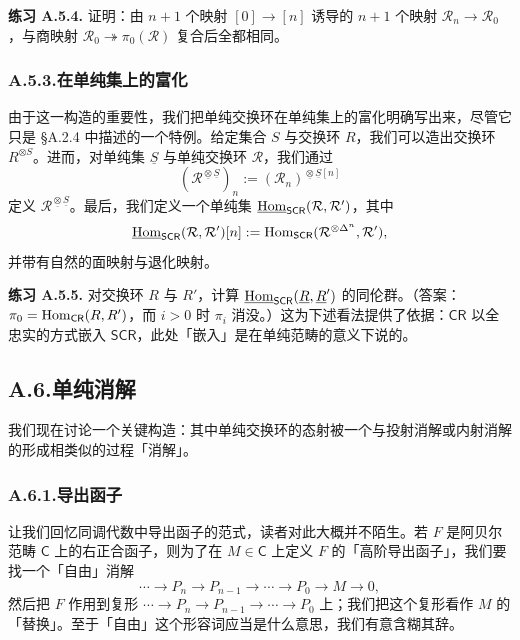 \medskip\noindent\textbf{练习 A.5.4.} 证明：由 $n+1$ 个映射 $[0]\to[n]$ 诱导的 $n+1$ 个映射 $\mathcal R_n\to\mathcal R_0$，与商映射 $\mathcal R_0\twoheadrightarrow\pi_0(\mathcal R)$ 复合后全都相同。

\subsubsection*{A.5.3.\quad 在单纯集上的富化}

由于这一构造的重要性，我们把单纯交换环在单纯集上的富化明确写出来，尽管它只是 §A.2.4 中描述的一个特例。给定集合 $S$ 与交换环 $R$，我们可以造出交换环 $R^{\otimes S}$。进而，对单纯集 $\underline S$ 与单纯交换环 $\mathcal R$，我们通过
\[
(\mathcal R^{\underline{\otimes}\underline S})_n:=(\mathcal R_n)^{\underline{\otimes}\underline S[n]}
\]
定义 $\mathcal R^{\underline{\otimes}\underline S}$。最后，我们定义一个单纯集 $\underline{\operatorname{Hom}}_{\mathsf{SCR}}(\mathcal R,\mathcal R')$，其中
\[
\underline{\operatorname{Hom}}_{\mathsf{SCR}}(\mathcal R,\mathcal R')[n]:=\operatorname{Hom}_{\mathsf{SCR}}(\mathcal R^{\otimes\Delta^n},\mathcal R'),
\]
并带有自然的面映射与退化映射。

\medskip\noindent\textbf{练习 A.5.5.} 对交换环 $R$ 与 $R'$，计算 $\underline{\operatorname{Hom}}_{\mathsf{SCR}}(\underline R,\underline R')$ 的同伦群。（答案：$\pi_0=\operatorname{Hom}_{\mathsf{CR}}(R,R')$，而 $i>0$ 时 $\pi_i$ 消没。）这为下述看法提供了依据：$\mathsf{CR}$ 以全忠实的方式嵌入 $\mathsf{SCR}$，此处「嵌入」是在单纯范畴的意义下说的。

\subsection*{A.6.\quad 单纯消解}

我们现在讨论一个关键构造：其中单纯交换环的态射被一个与投射消解或内射消解的形成相类似的过程「消解」。

\subsubsection*{A.6.1.\quad 导出函子}

让我们回忆同调代数中导出函子的范式，读者对此大概并不陌生。若 $F$ 是阿贝尔范畴 $\mathsf C$ 上的右正合函子，则为了在 $M\in\mathsf C$ 上定义 $F$ 的「高阶导出函子」，我们要找一个「自由」消解
\[
\cdots\to P_n\to P_{n-1}\to\cdots\to P_0\to M\to0,
\]
然后把 $F$ 作用到复形 $\cdots\to P_n\to P_{n-1}\to\cdots\to P_0$ 上；我们把这个复形看作 $M$ 的「替换」。至于「自由」这个形容词应当是什么意思，我们有意含糊其辞。

